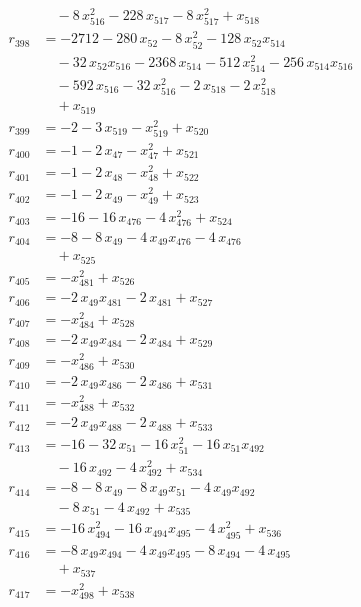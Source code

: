 \begin{align*}
&\quad{}- 8\,x_{516}^{2} - 228\,x_{517} - 8\,x_{517}^{2} + x_{518} \\
r_{398} &= -2712 - 280\,x_{52} - 8\,x_{52}^{2} - 128\,x_{52} x_{514} \\
&\quad{}- 32\,x_{52} x_{516} - 2368\,x_{514} - 512\,x_{514}^{2} - 256\,x_{514} x_{516} \\
&\quad{}- 592\,x_{516} - 32\,x_{516}^{2} - 2\,x_{518} - 2\,x_{518}^{2} \\
&\quad{}+ x_{519} \\
r_{399} &= -2 - 3\,x_{519} - x_{519}^{2} + x_{520} \\
r_{400} &= -1 - 2\,x_{47} - x_{47}^{2} + x_{521} \\
r_{401} &= -1 - 2\,x_{48} - x_{48}^{2} + x_{522} \\
r_{402} &= -1 - 2\,x_{49} - x_{49}^{2} + x_{523} \\
r_{403} &= -16 - 16\,x_{476} - 4\,x_{476}^{2} + x_{524} \\
r_{404} &= -8 - 8\,x_{49} - 4\,x_{49} x_{476} - 4\,x_{476} \\
&\quad{}+ x_{525} \\
r_{405} &= -x_{481}^{2} + x_{526} \\
r_{406} &= -2\,x_{49} x_{481} - 2\,x_{481} + x_{527} \\
r_{407} &= -x_{484}^{2} + x_{528} \\
r_{408} &= -2\,x_{49} x_{484} - 2\,x_{484} + x_{529} \\
r_{409} &= -x_{486}^{2} + x_{530} \\
r_{410} &= -2\,x_{49} x_{486} - 2\,x_{486} + x_{531} \\
r_{411} &= -x_{488}^{2} + x_{532} \\
r_{412} &= -2\,x_{49} x_{488} - 2\,x_{488} + x_{533} \\
r_{413} &= -16 - 32\,x_{51} - 16\,x_{51}^{2} - 16\,x_{51} x_{492} \\
&\quad{}- 16\,x_{492} - 4\,x_{492}^{2} + x_{534} \\
r_{414} &= -8 - 8\,x_{49} - 8\,x_{49} x_{51} - 4\,x_{49} x_{492} \\
&\quad{}- 8\,x_{51} - 4\,x_{492} + x_{535} \\
r_{415} &= -16\,x_{494}^{2} - 16\,x_{494} x_{495} - 4\,x_{495}^{2} + x_{536} \\
r_{416} &= -8\,x_{49} x_{494} - 4\,x_{49} x_{495} - 8\,x_{494} - 4\,x_{495} \\
&\quad{}+ x_{537} \\
r_{417} &= -x_{498}^{2} + x_{538} \\

\end{align*}
